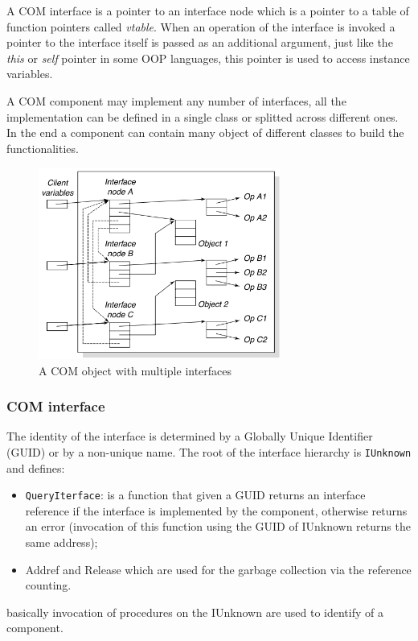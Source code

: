 A COM interface is a pointer to an interface node which is a pointer to a table of function pointers called \emph{vtable}.
When an operation of the interface is invoked a pointer to the interface itself is passed as an additional argument, just like the \emph{this} or \emph{self} pointer in some OOP languages, this pointer is used to access instance variables.

A COM component may implement any number of interfaces, all the implementation can be defined in a single class or splitted across different ones.
In the end a component can contain many object of different classes to build the functionalities.
\begin{figure}[H]
    \centering
    \includegraphics[width=300px]{images/3_Software_Components/COM_module.png}
    \caption{A COM object with multiple interfaces}
\end{figure}

\subsubsection{COM interface}
The identity of the interface is determined by a Globally Unique Identifier (GUID) or by a non-unique name.
The root of the interface hierarchy is \verb|IUnknown| and defines:
\begin{itemize}
    \item \verb|QueryIterface|: is a function that given a GUID returns an interface reference if the interface is implemented by the component, otherwise returns an error (invocation of this function using the GUID of IUnknown returns the same address);

    \item Addref and Release which are used for the garbage collection via the reference counting.
\end{itemize}
basically invocation of procedures on the IUnknown are used to identify of a component.


